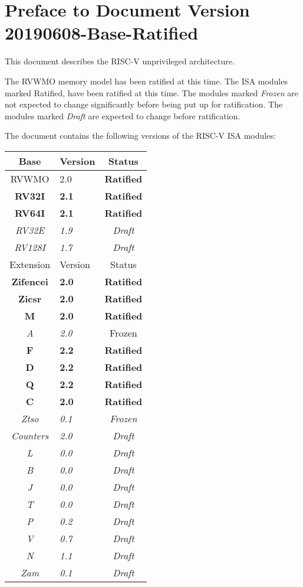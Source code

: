 \FloatBarrier

\section*{Preface to Document Version 20190608-Base-Ratified}

This document describes the RISC-V unprivileged architecture.  

The RVWMO memory model has been ratified at this time.  The ISA
modules marked Ratified, have been ratified at this time.  The modules
marked {\em Frozen} are not expected to change significantly before
being put up for ratification.  The modules marked {\em Draft} are
expected to change before ratification.

The document contains the following versions of the RISC-V ISA
modules:

{
\begin{table}[hbt]
  \centering
  \begin{tabular}{|c|l|c|}
    \hline
    Base           & Version & Status\\
    \hline
    RVWMO          & 2.0 & \bf Ratified   \\
    \bf RV32I      & \bf 2.1 & \bf Ratified \\
    \bf RV64I      & \bf 2.1 & \bf Ratified \\
    \em RV32E      & \em 1.9 & \em Draft \\
    \em RV128I     & \em 1.7 & \em Draft \\
    \hline
    Extension      & Version & Status \\
    \hline
    \bf Zifencei   & \bf 2.0 & \bf Ratified \\
    \bf Zicsr      & \bf 2.0 & \bf Ratified \\
    \bf M          & \bf 2.0 & \bf Ratified \\
    \em A          & \em 2.0 &  Frozen \\
    \bf F          & \bf 2.2 & \bf Ratified \\
    \bf D          & \bf 2.2 & \bf Ratified \\
    \bf Q          & \bf 2.2 & \bf Ratified \\
    \bf C          & \bf 2.0 & \bf Ratified \\
    \em Ztso       & \em 0.1 & \em Frozen \\
    \em Counters   & \em 2.0 & \em Draft \\
    \em L          & \em 0.0 & \em Draft \\
    \em B          & \em 0.0 & \em Draft \\
    \em J          & \em 0.0 & \em Draft \\
    \em T          & \em 0.0 & \em Draft \\
    \em P          & \em 0.2 & \em Draft \\
    \em V          & \em 0.7 & \em Draft \\
    \em N          & \em 1.1 & \em Draft \\
    \em Zam        & \em 0.1 & \em Draft \\
    \hline
  \end{tabular}
\end{table}
}


